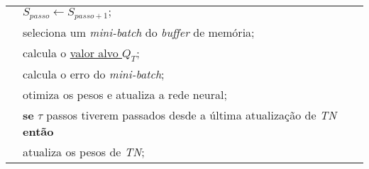 \begin{tabular}{l l}
 & \qquad \qquad \qquad $S_{passo} \leftarrow S_{passo+1};$ \\
 & \qquad \qquad seleciona um \textit{mini-batch} do \textit{buffer} de memória;\\
 & \qquad \qquad calcula o \hyperref[eq:q_target]{valor alvo $Q_{T}$};\\
 & \qquad \qquad calcula o erro do \textit{mini-batch};\\
 & \qquad \qquad otimiza os pesos e atualiza a rede neural;\\
 & \qquad \qquad \textbf{se} $\tau$ passos tiverem passados desde a última atualização de \textit{TN} \textbf{então}\\
 & \qquad \qquad \qquad atualiza os pesos de \textit{TN};\\
\hline
\end{tabular}
